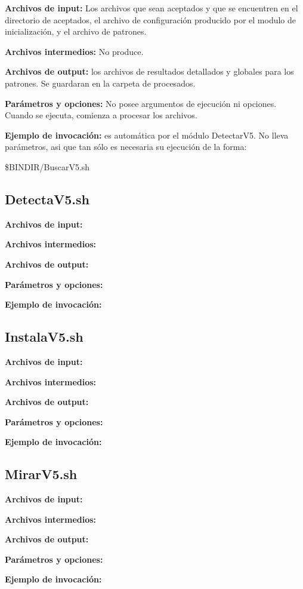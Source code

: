 \documentclass[a4paper,12pt]{article}
\begin{document}
{\bf Archivos de input:} Los archivos que sean aceptados y que se encuentren en el directorio de aceptados, el archivo de configuración producido por el modulo de inicialización, y el archivo de patrones.

{\bf Archivos intermedios:} No produce.

{\bf Archivos de output:} los archivos de resultados detallados y globales para los patrones. Se guardaran en la carpeta de procesados.

{\bf Parámetros y opciones:} No posee argumentos de ejecución ni opciones. Cuando se ejecuta, comienza a procesar los archivos.

{\bf Ejemplo de invocación:} es automática por el módulo DetectarV5. No lleva parámetros, asi que tan sólo es necesaria su ejecución de la forma:

\$BINDIR/BuscarV5.sh


\subsection{ DetectaV5.sh }

{\bf Archivos de input:}

{\bf Archivos intermedios:}

{\bf Archivos de output:}

{\bf Parámetros y opciones:}

{\bf Ejemplo de invocación:}


\subsection{ InstalaV5.sh }

{\bf Archivos de input:}

{\bf Archivos intermedios:}

{\bf Archivos de output:}

{\bf Parámetros y opciones:}

{\bf Ejemplo de invocación:}


\subsection{  MirarV5.sh }

{\bf Archivos de input:}

{\bf Archivos intermedios:}

{\bf Archivos de output:}

{\bf Parámetros y opciones:}

{\bf Ejemplo de invocación:}
\end{document}
